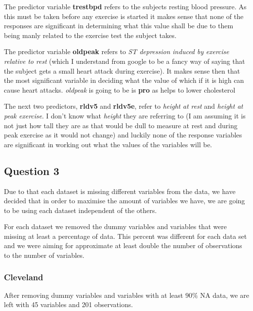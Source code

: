 \documentclass[a4paper]{article}
\begin{document}
\newpage

The predictor variable \textbf{trestbpd} refers to the subjects resting blood
pressure. As this must be taken before any exercise is started it makes sense
that none of the responses are significant in determining what this value shall
be due to them being manly related to the exercise test the subject takes.

\newpage

The predictor variable \textbf{oldpeak} refers to \textit{ST depression induced
by exercise relative to rest} (which I understand from google to be a fancy way
of saying that the subject gets a small heart attack during exercise). It makes
sense then that the most significant variable in deciding what the value of
which if it is high can cause heart attacks.
\textit{oldpeak} is going to be is \textbf{pro} as helps to lower cholesterol

\newpage
The next two predictors, \textbf{rldv5} and \textbf{rldv5e}, refer to
\textit{height at rest} and \textit{height at peak exercise}. I don't know what
\textit{height} they are referring to (I am assuming it is not just how tall
they are as that would be dull to measure at rest and during peak exercise as it
would not change) and luckily none of the response variables are significant in
working out what the values of the variables will be.



\newpage
\subsection{Question 3}

Due to that each dataset is missing different variables from the data, we have decided that in order to maximise the amount of variables we have, we are going to be using each dataset independent of the others. 

For each dataset we removed the dummy variables and variables that were missing at least a percentage of data. This percent was different for each data set and we were aiming for approximate at least double the number of observations to the number of variables. 

\subsubsection{Cleveland}

After removing dummy variables and variables with at least $90\%$ NA data, we are left with 45 variables and 201 observations. 
\end{document}
